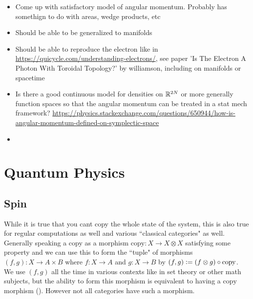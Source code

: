 \documentclass{book}
\begin{document}
	\begin{itemize}
		\item Come up with satisfactory model of angular momentum. Probably has somethign to do with areas, wedge products, etc 
		\item Should be able to be generalized to manifolds
		\item Should be able to reproduce the electron like in \href{https://quicycle.com/understanding-electrons/}{https://quicycle.com/understanding-electrons/}, see paper 'Is The Electron A Photon With Toroidal Topology?' by williamson, including on manifolds or spacetime
		\item Is there a good continuous model for densities on $\mathbb{R}^{2N}$ or more generally function spaces so that the angular momentum can be treated in a stat mech framework? \href{https://physics.stackexchange.com/questions/650944/how-is-angular-momentum-defined-on-symplectic-space}{https://physics.stackexchange.com/questions/650944/how-is-angular-momentum-defined-on-symplectic-space}
		\item 
	\end{itemize}
	
	
	
	
	
	
	\newpage
	\part{Quantum Physics}
	
	\newpage
	\chapter{Spin}
	 While it is true that you cant copy the whole state of the system, this is also true for regular computations as well and various ``classical categories" as well. Generally speaking a copy as a morphism $\text{copy}: X \rightarrow X \otimes X$ satisfying some property and we can use this to form the ``tuple" of morphisms $(f,g): X \rightarrow A \times B$ where $f:X \rightarrow A$ and $g:X \rightarrow B$ by $(f,g) \vcentcolon= (f \otimes g) \circ \text{copy}$. We use $(f,g)$ all the time in various contexts like in set theory or other math subjects, but the ability to form this morphism is equivalent to having a $\text{copy}$ morphism (). However not all categories have such a morphism.   \\
	
\end{document}
